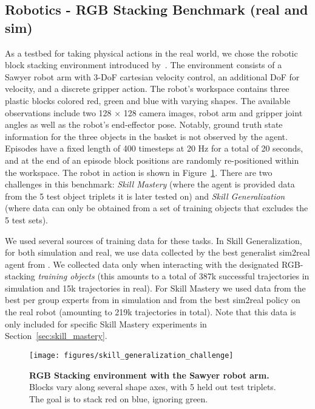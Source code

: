 \documentclass[10pt]{article} \usepackage[accepted]{tmlr}
\begin{document}
\subsection{Robotics - RGB Stacking Benchmark (real and sim)}
\vskip 0.2cm
As a testbed for taking physical actions in the real world, we chose the robotic block stacking environment introduced by~\citet{lee2021beyond}. The environment consists of a Sawyer robot arm with 3-DoF cartesian velocity control, an additional DoF for velocity, and a discrete gripper action. The robot's workspace contains three plastic blocks colored red, green and blue with varying shapes.
The available observations include two 128 $\times$ 128 camera images, robot arm and gripper joint angles as well as the robot's end-effector pose. Notably, ground truth state information for the three objects in the basket is not observed by the agent. Episodes have a fixed length of 400 timesteps at 20 Hz for a total of 20 seconds, and at the end of an episode block positions are randomly re-positioned within the workspace. The robot in action is shown in Figure~\ref{fig:stack_strike_cage}. There are two challenges in this benchmark: \emph{Skill Mastery} (where the agent is provided data from the 5 test object triplets it is later tested on) and \emph{Skill Generalization} (where data can only be obtained from a set of training objects that excludes the 5 test sets).

We used several sources of training data for these tasks. In Skill Generalization, for both simulation and real, we use data collected by the best generalist sim2real agent from \citet{lee2021beyond}. We collected data only when interacting with the designated RGB-stacking \emph{training objects} (this amounts to a total of 387k successful trajectories in simulation and 15k trajectories in real). For Skill Mastery we used data from the best per group experts from \citet{lee2021beyond} in simulation and from the best sim2real policy on the real robot (amounting to 219k trajectories in total). Note that this data is only included for specific Skill Mastery experiments in Section~\ref{sec:skill_mastery}.

\begin{figure}
    \texttt{[image: figures/skill\_generalization\_challenge]}
    \caption{{\bf RGB Stacking environment with the Sawyer robot arm.} Blocks vary along several shape axes, with 5 held out test triplets. The goal is to stack red on blue, ignoring green. \label{fig:stack_strike_cage}}
\end{figure}
\end{document}
